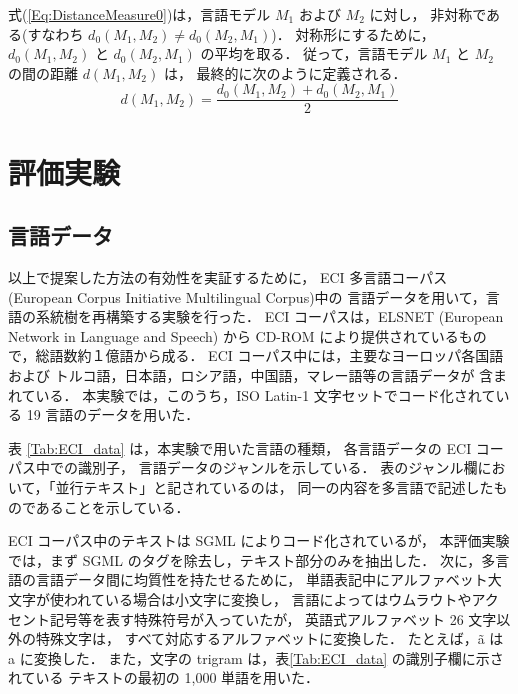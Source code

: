 式(\ref{Eq:DistanceMeasure0})は，言語モデル $M_1$ および $M_2$ に対し，
非対称である(すなわち $d_0(M_1, M_2) \neq d_0(M_2, M_1)$)．
対称形にするために，$d_0(M_1, M_2)$ と $d_0(M_2, M_1)$ の平均を取る．
従って，言語モデル $M_1$ と $M_2$ の間の距離 $d(M_1, M_2)$ は，
最終的に次のように定義される．
\begin{equation}
        d(M_1, M_2) = \frac{d_0(M_1, M_2) + d_0(M_2, M_1)}{2}
        \label{Eq:DistanceMeasure}
\end{equation}

\section{評価実験}

\subsection{言語データ}

以上で提案した方法の有効性を実証するために，
ECI 多言語コーパス
(European Corpus Initiative Multilingual Corpus)中の
言語データを用いて，言語の系統樹を再構築する実験を行った．
ECI コーパスは，ELSNET (European Network in Language and Speech)
から CD-ROM により提供されているもので，総語数約１億語から成る．
ECI コーパス中には，主要なヨーロッパ各国語および
トルコ語，日本語，ロシア語，中国語，マレー語等の言語データが
含まれている．
本実験では，このうち，ISO Latin-1 文字セットでコード化されている
19 言語のデータを用いた．

表 \ref{Tab:ECI_data} は，本実験で用いた言語の種類，
各言語データの ECI コーパス中での識別子，
言語データのジャンルを示している．
表のジャンル欄において，「並行テキスト」と記されているのは，
同一の内容を多言語で記述したものであることを示している．

ECI コーパス中のテキストは SGML によりコード化されているが，
本評価実験では，まず SGML のタグを除去し，テキスト部分のみを抽出した．
次に，多言語の言語データ間に均質性を持たせるために，
単語表記中にアルファベット大文字が使われている場合は小文字に変換し，
言語によってはウムラウトやアクセント記号等を表す特殊符号が入っていたが，
英語式アルファベット 26 文字以外の特殊文字は，
すべて対応するアルファベットに変換した．
たとえば，\~{a} は a に変換した．
また，文字の trigram は，表\ref{Tab:ECI_data} の識別子欄に示されている
テキストの最初の 1,000 単語を用いた．


